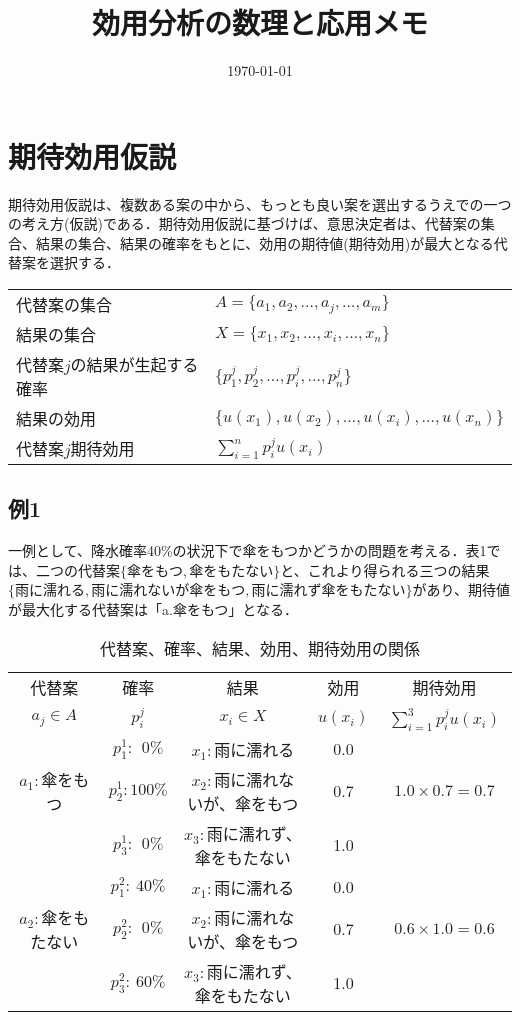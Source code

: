 \documentclass[a4j,12pt]{jsarticle}
\title{効用分析の数理と応用メモ}
\author{}
\date{\today}
\begin{document}
\maketitle


\section{期待効用仮説}
期待効用仮説は、複数ある案の中から、もっとも良い案を選出するうえでの一つの考え方(仮説)である．期待効用仮説に基づけば、意思決定者は、代替案の集合、結果の集合、結果の確率をもとに、効用の期待値(期待効用)が最大となる代替案を選択する．

\begin{center}
\begin{tabular}{ll} 
代替案の集合 & $A=\{a_1,a_2,\dots,a_j,\dots,a_m\}$ \\
結果の集合 & $X=\{x_1,x_2,\dots,x_i,\dots,x_n\}$ \\
代替案$j$の結果が生起する確率 & $\{p_1^j,p_2^j,\dots,p_i^j,\dots,p_n^j\}$ \\
結果の効用 & $\{u(x_1),u(x_2),\dots,u(x_i),\dots,u(x_n)\}$ \\
代替案$j$期待効用 & $\sum_{i=1}^n p_i^j u(x_i)$
\end{tabular}
\end{center}

\subsection{例1}
一例として、降水確率40\%の状況下で傘をもつかどうかの問題を考える．表1では、二つの代替案$\{ 傘をもつ,傘をもたない\}$と、これより得られる三つの結果$\{ 雨に濡れる,雨に濡れないが傘をもつ,雨に濡れず傘をもたない\}$があり、期待値が最大化する代替案は「a.傘をもつ」となる．


\begin{table}[htbp]
\begin{center}
\begin{tabular}{ccccc}  \toprule
	代替案		 	& 確率		& 結果 							& 効用 				& 期待効用					　	\\ 
	$a_j\in A$			 	& $p_i^j$		& $x_i \in X$ 							& $u(x_i)$ 			& $ \sum_{i=1}^3 p_i^j u(x_i)$　	\\ 	\midrule
					& $p_1^1:\ \ 0\%$  		& $x_1:$雨に濡れる 					& 0.0 				& 							\\ 		
	$a_1:$傘をもつ 	& $p_2^1:100\%$ 	& $x_2:$雨に濡れないが、傘をもつ 		& 0.7				& $1.0\times0.7=0.7$			\\ 				
					& $p_3^1:\ \ 0\%$  		& $x_3:$雨に濡れず、傘をもたない 		& 1.0 				& 							\\	\midrule
					& $p_1^2:\ 40\%$  		& $x_1:$雨に濡れる 					& 0.0 				& 							\\ 		
	$a_2:$傘をもたない 	& $p_2^2:\ \ 0\%$ 		& $x_2:$雨に濡れないが、傘をもつ 		& 0.7 				& $0.6\times1.0=0.6$			\\ 		
					& $p_3^2:\ 60\%$  		& $x_3:$雨に濡れず、傘をもたない 		& 1.0 				& 							\\	\bottomrule
\end{tabular}
\end{center}
\caption{代替案、確率、結果、効用、期待効用の関係}
\end{table}
\end{document}
